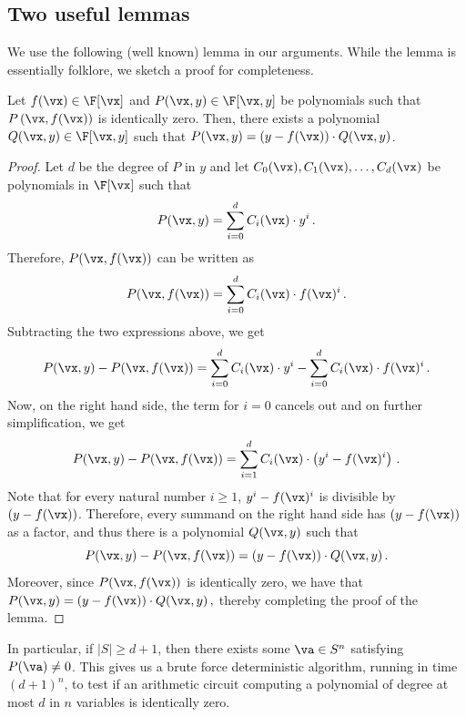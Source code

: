 \subsection{Two useful lemmas}
We use the following (well known) lemma in our arguments. While the lemma is essentially folklore, we sketch a proof for completeness. 
\begin{lemma}\label{lem:remainder}
Let $f(\vx) \in \F[\vx]$ and $P(\vx, y) \in \F[\vx, y]$ be  polynomials such that $P\left(\vx, f(\vx)\right)$  is identically zero. Then, there exists a polynomial $Q(\vx, y) \in \F[\vx, y]$ such that $P(\vx, y) = (y-f(\vx))\cdot Q(\vx, y)$. 
\end{lemma}
\begin{proof}[Proof]
Let $d$ be the degree of $P$ in $y$ and let $C_0(\vx), C_1(\vx), \ldots, C_d(\vx)$ be polynomials in $\F[\vx]$ such that 
\[
P(\vx, y) = \sum_{i = 0}^d C_i(\vx)\cdot y^i \, .
\]
Therefore, $P(\vx, f(\vx))$ can be written as 
\[
P(\vx, f(\vx)) = \sum_{i = 0}^d C_i(\vx)\cdot f(\vx)^i \, .
\]
Subtracting the two expressions above, we get 
\[
P(\vx, y) - P(\vx, f(\vx)) =  \sum_{i = 0}^d C_i(\vx)\cdot y^i  - \sum_{i = 0}^d C_i(\vx)\cdot f(\vx)^i \, .
\]
Now, on the right hand side, the term for $i = 0$ cancels out and on further simplification, we get 
\[
P(\vx, y) - P(\vx, f(\vx)) =  \sum_{i = 1}^d C_i(\vx)\cdot \left(y^i - f(\vx)^i\right)  \, .
\]
Note that for every natural number $i \geq 1$, $y^i-f(\vx)^i$ is divisible by  $(y-f(\vx))$. Therefore, every summand on the right hand side has $(y-f(\vx))$ as a factor, and thus there is a polynomial $Q(\vx, y)$ such that 
\[
P(\vx, y) - P(\vx, f(\vx)) =  (y-f(\vx))\cdot Q(\vx, y)  \, .
\]
Moreover, since $P(\vx, f(\vx))$ is identically zero, we have that $
P(\vx, y) =  (y-f(\vx))\cdot Q(\vx, y)  \, , 
$ thereby completing the proof of the lemma. 
\end{proof}
%
In particular, if $|S| \ge d+1$, then there exists some $\va \in S^n$ satisfying $P(\va) \ne 0$. 
This gives us a brute force deterministic algorithm, running in time $(d+1)^n$, to test if an arithmetic circuit computing a polynomial of degree at most $d$ in $n$ variables is identically zero.


